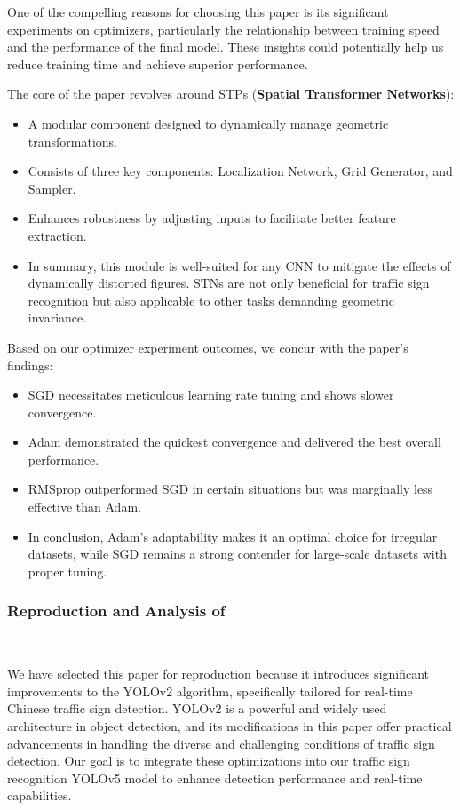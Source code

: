 \documentclass[letterpaper, 10 pt, conference]{ieeeconf}
\begin{document}
One of the compelling reasons for choosing this paper is its significant experiments on optimizers, particularly the relationship between training speed and the performance of the final model. These insights could potentially help us reduce training time and achieve superior performance.

The core of the paper revolves around STPs (\textbf{Spatial Transformer Networks}):
\begin{itemize}
    \item A modular component designed to dynamically manage geometric transformations.
    \item Consists of three key components: Localization Network, Grid Generator, and Sampler.
    \item Enhances robustness by adjusting inputs to facilitate better feature extraction.
    \item In summary, this module is well-suited for any CNN to mitigate the effects of dynamically distorted figures. STNs are not only beneficial for traffic sign recognition but also applicable to other tasks demanding geometric invariance.
\end{itemize}

Based on our optimizer experiment outcomes, we concur with the paper's findings:

\begin{itemize}
    \item SGD necessitates meticulous learning rate tuning and shows slower convergence.
    \item Adam demonstrated the quickest convergence and delivered the best overall performance.
    \item RMSprop outperformed SGD in certain situations but was marginally less effective than Adam.
    \item In conclusion, Adam's adaptability makes it an optimal choice for irregular datasets, while SGD remains a strong contender for large-scale datasets with proper tuning.
\end{itemize}


\subsubsection{Reproduction and Analysis of \cite{zhang2017real}}\

We have selected this paper for reproduction because it introduces significant improvements to the YOLOv2 algorithm, specifically tailored for real-time Chinese traffic sign detection. YOLOv2 is a powerful and widely used architecture in object detection, and its modifications in this paper offer practical advancements in handling the diverse and challenging conditions of traffic sign detection. Our goal is to integrate these optimizations into our traffic sign recognition YOLOv5 model to enhance detection performance and real-time capabilities.
\end{document}
